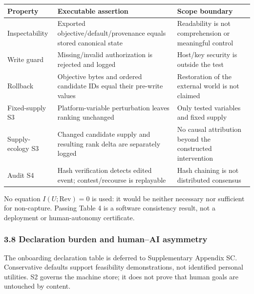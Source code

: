 \documentclass[
  11pt]{article}
\begin{document}
\begin{longtable}[]{@{}
  >{\raggedright\arraybackslash}p{}
  >{\raggedright\arraybackslash}p{}
  >{\raggedright\arraybackslash}p{}@{}}
\toprule\noalign{}
\begin{minipage}[b]{\linewidth}\raggedright
Property
\end{minipage} & \begin{minipage}[b]{\linewidth}\raggedright
Executable assertion
\end{minipage} & \begin{minipage}[b]{\linewidth}\raggedright
Scope boundary
\end{minipage} \\
\midrule\noalign{}
\endhead
\bottomrule\noalign{}
\endlastfoot
Inspectability & Exported objective/default/provenance equals stored
canonical state & Readability is not comprehension or meaningful
control \\
Write guard & Missing/invalid authorization is rejected and logged &
Host/key security is outside the test \\
Rollback & Objective bytes and ordered candidate IDs equal their
pre-write values & Restoration of the external world is not claimed \\
Fixed-supply S3 & Platform-variable perturbation leaves ranking
unchanged & Only tested variables and fixed supply \\
Supply-ecology S3 & Changed candidate supply and resulting rank delta
are separately logged & No causal attribution beyond the constructed
intervention \\
Audit S4 & Hash verification detects edited event; contest/recourse is
replayable & Hash chaining is not distributed consensus \\
\end{longtable}

No equation \(I(U;\mathrm{Rev})=0\) is used: it would be neither
necessary nor sufficient for non-capture. Passing Table 4 is a software
consistency result, not a deployment or human-autonomy certificate.

\subsubsection{3.8 Declaration burden and human--AI
asymmetry}\label{declaration-burden-and-humanai-asymmetry}

The onboarding declaration table is deferred to Supplementary Appendix
SC. Conservative defaults support feasibility demonstrations, not
identified personal utilities. S2 governs the machine store; it does not
prove that human goals are untouched by content.
\end{document}
